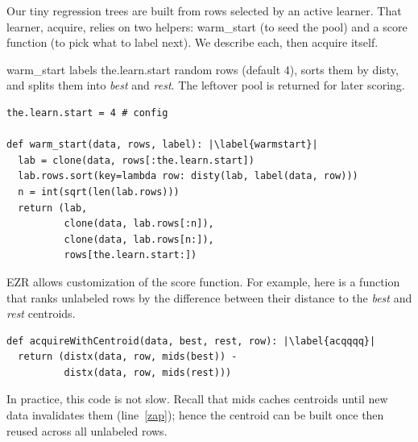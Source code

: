 \documentclass[AMA,STIX2COL]{WileyNJDv5}
\begin{document}
Our tiny regression trees are built from rows selected by an active 
learner. That learner, \textsf{acquire}, relies on two helpers: 
\textsf{warm\_start} (to seed the pool) and a \textsf{score} function 
(to pick what to label next). We describe each, then \textsf{acquire} 
itself.

\textsf{warm\_start} labels \textsf{the.learn.start} random rows
(default 4), sorts them by \textsf{disty}, and splits them into
\textit{best} and \textit{rest}. The leftover pool is returned for
later scoring.
\begin{verbatim}
the.learn.start = 4 # config

def warm_start(data, rows, label): |\label{warmstart}|
  lab = clone(data, rows[:the.learn.start])
  lab.rows.sort(key=lambda row: disty(lab, label(data, row)))
  n = int(sqrt(len(lab.rows)))
  return (lab,
          clone(data, lab.rows[:n]),
          clone(data, lab.rows[n:]),
          rows[the.learn.start:])
\end{verbatim}
EZR allows  customization of the 
\textsf{score} function. For example,
here is a function that ranks unlabeled rows by the difference between their 
distance to the \textit{best} and \textit{rest} centroids. 
\begin{verbatim}
def acquireWithCentroid(data, best, rest, row): |\label{acqqqq}|
  return (distx(data, row, mids(best)) -
          distx(data, row, mids(rest)))
\end{verbatim}
In practice, this code is not slow. Recall that
\textsf{mids} caches centroids until new data invalidates them 
(line~\ref{zap}); hence the centroid
can be  built once  then reused across all unlabeled rows.
\end{document}

